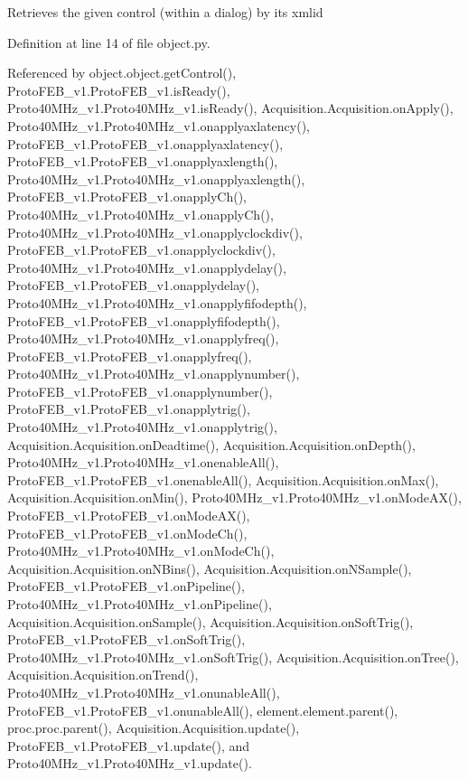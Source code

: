 \begin{DoxyVerb}Retrieves the given control (within a dialog) by its xmlid\end{DoxyVerb}
 

Definition at line 14 of file object.\+py.



Referenced by object.\+object.\+get\+Control(), Proto\+F\+E\+B\+\_\+v1.\+Proto\+F\+E\+B\+\_\+v1.\+is\+Ready(), Proto40\+M\+Hz\+\_\+v1.\+Proto40\+M\+Hz\+\_\+v1.\+is\+Ready(), Acquisition.\+Acquisition.\+on\+Apply(), Proto40\+M\+Hz\+\_\+v1.\+Proto40\+M\+Hz\+\_\+v1.\+onapplyaxlatency(), Proto\+F\+E\+B\+\_\+v1.\+Proto\+F\+E\+B\+\_\+v1.\+onapplyaxlatency(), Proto\+F\+E\+B\+\_\+v1.\+Proto\+F\+E\+B\+\_\+v1.\+onapplyaxlength(), Proto40\+M\+Hz\+\_\+v1.\+Proto40\+M\+Hz\+\_\+v1.\+onapplyaxlength(), Proto\+F\+E\+B\+\_\+v1.\+Proto\+F\+E\+B\+\_\+v1.\+onapply\+Ch(), Proto40\+M\+Hz\+\_\+v1.\+Proto40\+M\+Hz\+\_\+v1.\+onapply\+Ch(), Proto40\+M\+Hz\+\_\+v1.\+Proto40\+M\+Hz\+\_\+v1.\+onapplyclockdiv(), Proto\+F\+E\+B\+\_\+v1.\+Proto\+F\+E\+B\+\_\+v1.\+onapplyclockdiv(), Proto40\+M\+Hz\+\_\+v1.\+Proto40\+M\+Hz\+\_\+v1.\+onapplydelay(), Proto\+F\+E\+B\+\_\+v1.\+Proto\+F\+E\+B\+\_\+v1.\+onapplydelay(), Proto40\+M\+Hz\+\_\+v1.\+Proto40\+M\+Hz\+\_\+v1.\+onapplyfifodepth(), Proto\+F\+E\+B\+\_\+v1.\+Proto\+F\+E\+B\+\_\+v1.\+onapplyfifodepth(), Proto40\+M\+Hz\+\_\+v1.\+Proto40\+M\+Hz\+\_\+v1.\+onapplyfreq(), Proto\+F\+E\+B\+\_\+v1.\+Proto\+F\+E\+B\+\_\+v1.\+onapplyfreq(), Proto40\+M\+Hz\+\_\+v1.\+Proto40\+M\+Hz\+\_\+v1.\+onapplynumber(), Proto\+F\+E\+B\+\_\+v1.\+Proto\+F\+E\+B\+\_\+v1.\+onapplynumber(), Proto\+F\+E\+B\+\_\+v1.\+Proto\+F\+E\+B\+\_\+v1.\+onapplytrig(), Proto40\+M\+Hz\+\_\+v1.\+Proto40\+M\+Hz\+\_\+v1.\+onapplytrig(), Acquisition.\+Acquisition.\+on\+Deadtime(), Acquisition.\+Acquisition.\+on\+Depth(), Proto40\+M\+Hz\+\_\+v1.\+Proto40\+M\+Hz\+\_\+v1.\+onenable\+All(), Proto\+F\+E\+B\+\_\+v1.\+Proto\+F\+E\+B\+\_\+v1.\+onenable\+All(), Acquisition.\+Acquisition.\+on\+Max(), Acquisition.\+Acquisition.\+on\+Min(), Proto40\+M\+Hz\+\_\+v1.\+Proto40\+M\+Hz\+\_\+v1.\+on\+Mode\+A\+X(), Proto\+F\+E\+B\+\_\+v1.\+Proto\+F\+E\+B\+\_\+v1.\+on\+Mode\+A\+X(), Proto\+F\+E\+B\+\_\+v1.\+Proto\+F\+E\+B\+\_\+v1.\+on\+Mode\+Ch(), Proto40\+M\+Hz\+\_\+v1.\+Proto40\+M\+Hz\+\_\+v1.\+on\+Mode\+Ch(), Acquisition.\+Acquisition.\+on\+N\+Bins(), Acquisition.\+Acquisition.\+on\+N\+Sample(), Proto\+F\+E\+B\+\_\+v1.\+Proto\+F\+E\+B\+\_\+v1.\+on\+Pipeline(), Proto40\+M\+Hz\+\_\+v1.\+Proto40\+M\+Hz\+\_\+v1.\+on\+Pipeline(), Acquisition.\+Acquisition.\+on\+Sample(), Acquisition.\+Acquisition.\+on\+Soft\+Trig(), Proto\+F\+E\+B\+\_\+v1.\+Proto\+F\+E\+B\+\_\+v1.\+on\+Soft\+Trig(), Proto40\+M\+Hz\+\_\+v1.\+Proto40\+M\+Hz\+\_\+v1.\+on\+Soft\+Trig(), Acquisition.\+Acquisition.\+on\+Tree(), Acquisition.\+Acquisition.\+on\+Trend(), Proto40\+M\+Hz\+\_\+v1.\+Proto40\+M\+Hz\+\_\+v1.\+onunable\+All(), Proto\+F\+E\+B\+\_\+v1.\+Proto\+F\+E\+B\+\_\+v1.\+onunable\+All(), element.\+element.\+parent(), proc.\+proc.\+parent(), Acquisition.\+Acquisition.\+update(), Proto\+F\+E\+B\+\_\+v1.\+Proto\+F\+E\+B\+\_\+v1.\+update(), and Proto40\+M\+Hz\+\_\+v1.\+Proto40\+M\+Hz\+\_\+v1.\+update().


